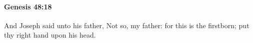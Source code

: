 
		\paragraph{Genesis 48:18} %
			\label{GENESIS-48-18}

			And Joseph said unto his father, Not so, my father: for this is the firstborn; put thy right hand upon his head.


